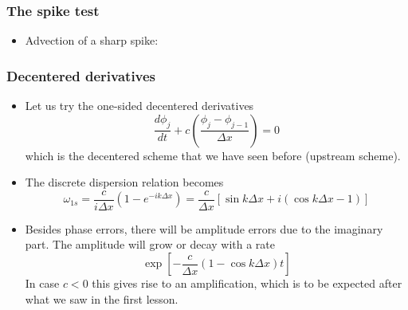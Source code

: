 \documentclass[aspectratio=43,9pt]{beamer}
\begin{document}
%
%
\begin{frame}
	\frametitle{The spike test}
	\vfill\begin{itemize}
		\item Advection of a sharp spike:
			\begin{center}
				\scalebox{.8}{}
			\end{center}
	\end{itemize}\vfill
\end{frame}
%
%
\begin{frame}
	\frametitle{Decentered derivatives}
	\vfill\begin{itemize}
		\item Let us try the one-sided decentered derivatives
			\begin{equation*}
				\frac{d \phi_j}{dt} + c \left(\frac{\phi_j - \phi_{j-1}}{\Delta x} \right) =0
			\end{equation*}
			which is the decentered scheme that we have seen before (upstream scheme).\vfill
		\item The discrete dispersion relation becomes
			\begin{equation*}
				\omega_{1s} = \frac{c}{i \Delta x} \left(1 - e^{- i k \Delta x}\right) 
					= \frac{c}{\Delta x}	\left[\sin k \Delta x +	i \left(\cos k \Delta x -1	\right)\right]
			\end{equation*}\vfill
		\item Besides phase errors, there will be amplitude errors due to the imaginary part. The amplitude will grow or decay with a rate
			\begin{equation*}
				\exp \left[ - \frac{c}{\Delta x} \left( 1 - \cos k \Delta x \right) t \right]
			\end{equation*}
			In case $c<0$ this gives rise to an amplification, which is to be expected after what we saw in the first lesson.
	\end{itemize}\vfill
\end{frame}
%
%
\end{document}
